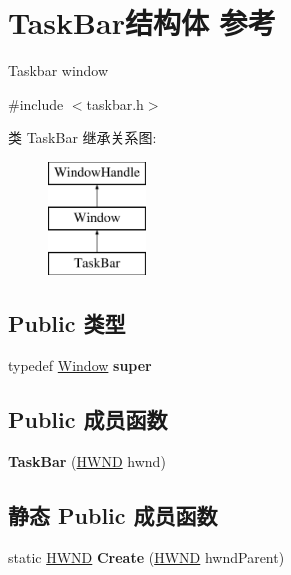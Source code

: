 \hypertarget{struct_task_bar}{}\section{Task\+Bar结构体 参考}
\label{struct_task_bar}


Taskbar window  




{\ttfamily \#include $<$taskbar.\+h$>$}

类 Task\+Bar 继承关系图\+:\begin{figure}[H]
\begin{center}
\leavevmode
\includegraphics[height=3.000000cm]{struct_task_bar}
\end{center}
\end{figure}
\subsection*{Public 类型}
\begin{DoxyCompactItemize}
\item 
\mbox{\label{struct_task_bar_ae70443ff292c5c042725631d2e67cbe6}} 
typedef \hyperlink{struct_window}{Window} {\bfseries super}
\end{DoxyCompactItemize}
\subsection*{Public 成员函数}
\begin{DoxyCompactItemize}
\item 
\mbox{\label{struct_task_bar_aaf1cb1cfa01fbb743c2d924628b1a25f}} 
{\bfseries Task\+Bar} (\hyperlink{interfacevoid}{H\+W\+ND} hwnd)
\end{DoxyCompactItemize}
\subsection*{静态 Public 成员函数}
\begin{DoxyCompactItemize}
\item 
\mbox{\label{struct_task_bar_abaf728a1e798828635e8c993a94d1292}} 
static \hyperlink{interfacevoid}{H\+W\+ND} {\bfseries Create} (\hyperlink{interfacevoid}{H\+W\+ND} hwnd\+Parent)
\end{DoxyCompactItemize}
